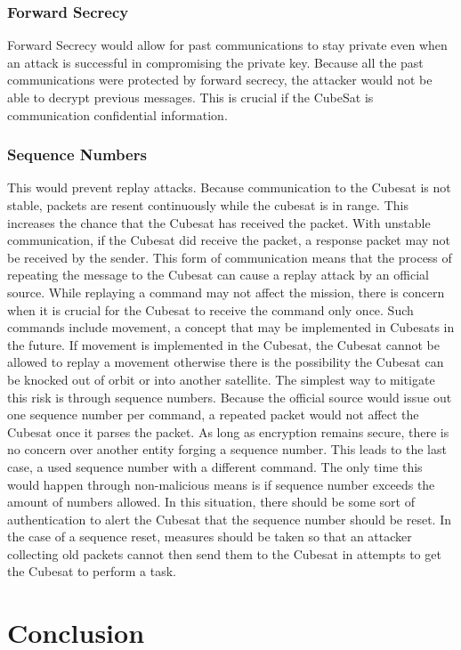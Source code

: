 \documentclass[12pt]{article}
\begin{document}
\begin{multicols}{2}
\subsubsection{Forward Secrecy}
Forward Secrecy would allow for past communications to stay private even when an attack is successful in compromising the private key. Because all the past communications were protected by forward secrecy, the attacker would not be able to decrypt previous messages. This is crucial if the CubeSat is communication confidential information.
\subsubsection{Sequence Numbers}
This would prevent replay attacks. Because communication to the Cubesat is not stable, packets are resent continuously while the cubesat is in range. This increases the chance that the Cubesat has received the packet. With unstable communication, if the Cubesat did receive the packet, a response packet may not be received by the sender. This form of communication means that the process of repeating the message to the Cubesat can cause a replay attack by an official source. While replaying a command may not affect the mission, there is concern when it is crucial for the Cubesat to receive the command only once. Such commands include movement, a concept that may be implemented in Cubesats in the future. If movement is implemented in the Cubesat, the Cubesat cannot be allowed to replay a movement otherwise there is the possibility the Cubesat can be knocked out of orbit or into another satellite. The simplest way to mitigate this risk is through sequence numbers. Because the official source would issue out one sequence number per command, a repeated packet would not affect the Cubesat once it parses the packet. As long as encryption remains secure, there is no concern over another entity forging a sequence number. This leads to the last case, a used sequence number with a different command. The only time this would happen through non-malicious means is if sequence number exceeds the amount of numbers allowed. In this situation, there should be some sort of authentication to alert the Cubesat that the sequence number should be reset. In the case of a sequence reset, measures should be taken so that an attacker collecting old packets cannot then send them to the Cubesat in attempts to get the Cubesat to perform a task.
\section{Conclusion}

\clearpage
\nocite{*}
\def\UrlBreaks{\do\/\do-}




\end{multicols}
\end{document}
